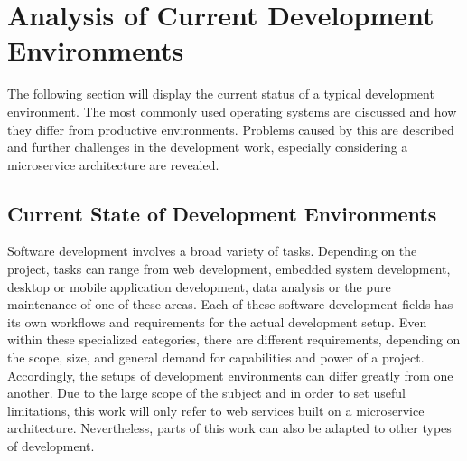 

\section{Analysis of Current Development Environments}\label{sec::problem}
The following section will display the current status of a typical development environment. The most commonly used operating systems are discussed and how they differ from productive environments. Problems caused by this are described and further challenges in the development work, especially considering a microservice architecture are revealed.

    \subsection{Current State of Development Environments}
    Software development involves a broad variety of tasks. Depending on the project, tasks can range from web development, embedded system development, desktop or mobile application development, data analysis or the pure maintenance of one of these areas. Each of these software development fields has its own workflows and requirements for the actual development setup. Even within these specialized categories, there are different requirements, depending on the scope, size, and general demand for capabilities and power of a project. Accordingly, the setups of development environments can differ greatly from one another. Due to the large scope of the subject and in order to set useful limitations, this work will only refer to web services built on a microservice architecture. Nevertheless, parts of this work can also be adapted to other types of development.\newline
